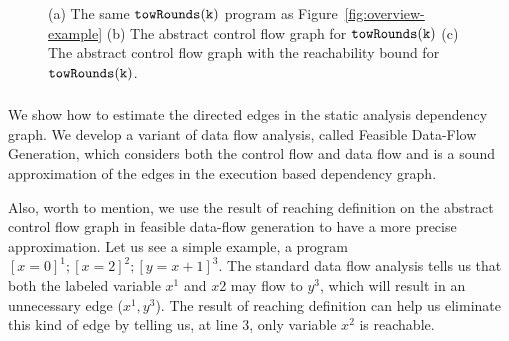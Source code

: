 \begin{figure}
    \vspace{-0.3cm}
    \caption{(a) The same $\mathtt{towRounds(k)}$ program as Figure~\ref{fig:overview-example}
    (b) The abstract control flow graph for $\mathtt{towRounds(k)}$  (c) The abstract control flow graph with the reachability bound for $\mathtt{towRounds(k)}$.}
    \vspace{-0.5cm}
    \label{fig:abscfg_tworound}
  \end{figure}
%

\subsubsection{}
\label{sec:alg_edgegen}
  We show how to estimate the directed edges in the static analysis dependency graph.
We develop a variant of data flow analysis, called Feasible Data-Flow Generation, which 
considers both the control flow and data flow and
is a sound approximation of the edges in the execution based dependency graph.

  Also, worth to mention, we use the result of reaching definition on the abstract control flow graph in feasible 
data-flow generation to have a more precise approximation. Let us see a simple example, a program $ [x = 0]^{1}; [x=2]^{2};  [y = x+1]^{3}$. The standard data flow analysis 
tells us that both the labeled variable $x^{1}$ and $x${2} may flow to $y^{3}$, which will result in an unnecessary edge ($x^{1}, y^{3}$). The result of reaching definition 
can help us eliminate this kind of edge by telling us, at line $3$, only variable $x^{2}$ is reachable. 


